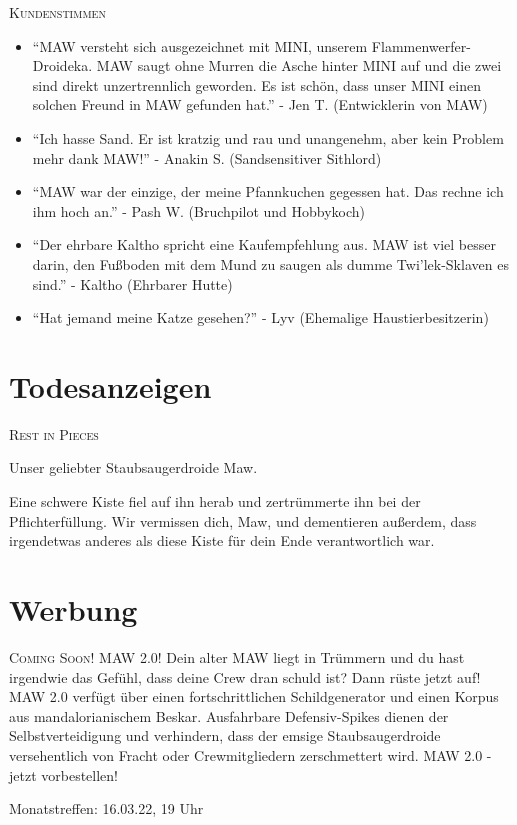 \documentclass[final]{multiversum}
\begin{document}
\textsc{Kundenstimmen}
\begin{itemize}
\item \enquote{MAW versteht sich ausgezeichnet mit MINI, unserem Flammenwerfer-Droideka.
      MAW saugt ohne Murren die Asche hinter MINI auf und die zwei sind direkt unzertrennlich geworden. 
      Es ist schön, dass unser MINI einen solchen Freund in MAW gefunden hat.}
      - Jen T. (Entwicklerin von MAW)
\item \enquote{Ich hasse Sand. 
      Er ist kratzig und rau und unangenehm, aber kein Problem mehr dank MAW!}
      - Anakin S. (Sandsensitiver Sithlord)
\item \enquote{MAW war der einzige, der meine Pfannkuchen gegessen hat.
      Das rechne ich ihm hoch an.}
      - Pash W. (Bruchpilot und Hobbykoch)
\item \enquote{Der ehrbare Kaltho spricht eine Kaufempfehlung aus.
      MAW ist viel besser darin, den Fußboden mit dem Mund zu saugen als dumme Twi'lek-Sklaven es sind.}
      - Kaltho (Ehrbarer Hutte)
\item \enquote{Hat jemand meine Katze gesehen?}
      - Lyv (Ehemalige Haustierbesitzerin)
\end{itemize}

\section{Todesanzeigen}
\textsc{Rest in Pieces}
\begin{center}Unser geliebter Staubsaugerdroide Maw.\end{center} 
Eine schwere Kiste fiel auf ihn herab und zertrümmerte ihn bei der Pflichterfüllung.
Wir vermissen dich, Maw, und dementieren außerdem, dass irgendetwas anderes als diese Kiste für dein Ende verantwortlich war. 

\section{Werbung}
\textsc{Coming Soon! MAW 2.0!}
Dein alter MAW liegt in Trümmern und du hast irgendwie das Gefühl, dass deine Crew dran schuld ist? 
Dann rüste jetzt auf! MAW 2.0 verfügt über einen fortschrittlichen Schildgenerator und einen Korpus aus mandalorianischem Beskar. Ausfahrbare Defensiv-Spikes dienen der Selbstverteidigung und verhindern, dass der emsige Staubsaugerdroide versehentlich von Fracht oder Crewmitgliedern zerschmettert wird. 
MAW 2.0 - jetzt vorbestellen!


\begin{termine}
\item Monatstreffen: 16.03.22, 19 Uhr
\end{termine}
\impressum
\end{document}
